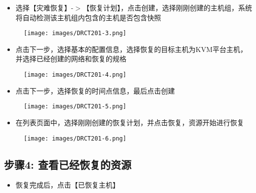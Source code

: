 \begin{itemize}
\item 选择【灾难恢复】-$>$【恢复计划】，点击创建，选择刚刚创建的主机组，系统将自动检测该主机组内包含的主机是否包含快照

\end{itemize}

\begin{figure}[htbp]
\centering
\texttt{[image: images/DRCT201-3.png]}
\end{figure}

\begin{itemize}
\item 点击下一步，选择基本的配置信息，选择恢复的目标主机为KVM平台主机，并选择已经创建的网络和恢复的规格

\end{itemize}

\begin{figure}[htbp]
\centering
\texttt{[image: images/DRCT201-4.png]}
\end{figure}

\begin{itemize}
\item 点击下一步，选择恢复的时间点信息，最后点击创建

\end{itemize}

\begin{figure}[htbp]
\centering
\texttt{[image: images/DRCT201-5.png]}
\end{figure}

\begin{itemize}
\item 在列表页面中，选择刚刚创建的恢复计划，并点击恢复，资源开始进行恢复

\end{itemize}

\begin{figure}[htbp]
\centering
\texttt{[image: images/DRCT201-6.png]}
\end{figure}

\subsection{步骤4: 查看已经恢复的资源}
\label{步骤4:查看已经恢复的资源}

\begin{itemize}
\item 恢复完成后，点击【已恢复主机】

\end{itemize}

